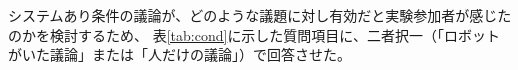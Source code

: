 \documentclass[11pt, a4paper]{jreport} %
\begin{document}

システムあり条件の議論が、どのような議題に対し有効だと実験参加者が感じたのかを検討するため、
表\ref{tab:cond}に示した質問項目に、二者択一（「ロボットがいた議論」または「人だけの議論」）で回答させた。
\end{document}
